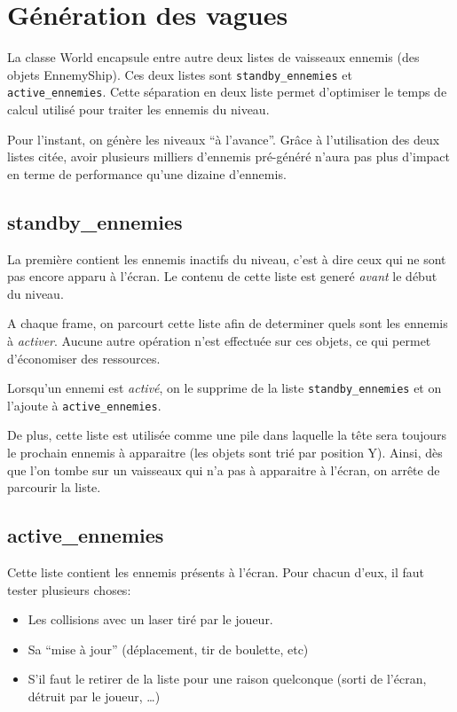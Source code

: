 \documentclass[a4paper, 12pt]{report}
\begin{document}
\newpage

\section{Génération des vagues}


La classe World encapsule entre autre deux listes de vaisseaux ennemis (des
objets EnnemyShip). Ces deux listes sont \verb|standby_ennemies| et
\verb|active_ennemies|.
Cette séparation en deux liste permet d'optimiser le temps de calcul utilisé
pour traiter les ennemis du niveau.

Pour l'instant, on génère les niveaux ``à l'avance''. Grâce à l'utilisation des
deux listes citée, avoir plusieurs milliers d'ennemis pré-généré n'aura pas
plus d'impact en terme de performance qu'une dizaine d'ennemis.

\subsection{standby\_ennemies}

La première contient les ennemis inactifs du niveau, c'est à dire ceux qui ne
sont pas encore apparu à l'écran. Le contenu de cette liste est generé
\emph{avant} le début du niveau.

A chaque frame, on parcourt cette liste afin
de determiner quels sont les ennemis à \emph{activer}. Aucune autre opération
n'est effectuée sur ces objets, ce qui permet d'économiser des ressources.

Lorsqu'un ennemi est \emph{activé}, on le supprime de la liste
\verb|standby_ennemies| et on l'ajoute à \verb|active_ennemies|.

De plus, cette liste est utilisée comme une pile dans laquelle la tête sera
toujours le prochain ennemis à apparaitre (les objets sont trié par position
Y). Ainsi, dès que l'on tombe sur un vaisseaux qui n'a pas à apparaitre à
l'écran, on arrête de parcourir la liste.

\subsection{active\_ennemies}

Cette liste contient les ennemis présents à l'écran. Pour chacun d'eux, il faut
tester plusieurs choses:
\begin{itemize}
    \item Les collisions avec un laser tiré par le joueur.
    \item Sa ``mise à jour'' (déplacement, tir de boulette, etc)
    \item S'il faut le retirer de la liste pour une raison quelconque (sorti de
        l'écran, détruit par le joueur, \ldots)
\end{itemize}
\end{document}
